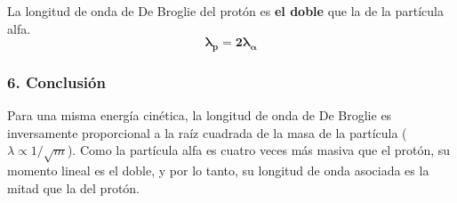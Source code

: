 \begin{cajaresultado}
La longitud de onda de De Broglie del protón es \textbf{el doble} que la de la partícula alfa.
$$ \boldsymbol{\lambda_p = 2\lambda_{\alpha}} $$
\end{cajaresultado}

\subsubsection*{6. Conclusión}
\begin{cajaconclusion}
Para una misma energía cinética, la longitud de onda de De Broglie es inversamente proporcional a la raíz cuadrada de la masa de la partícula ($\lambda \propto 1/\sqrt{m}$). Como la partícula alfa es cuatro veces más masiva que el protón, su momento lineal es el doble, y por lo tanto, su longitud de onda asociada es la mitad que la del protón.
\end{cajaconclusion}

\newpage